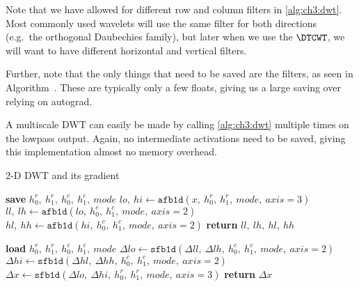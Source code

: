 Note that we have allowed for different row and column
filters in \autoref{alg:ch3:dwt}. Most commonly used wavelets will use the same
filter for both directions (e.g.\ the orthogonal Daubechies family), but later
when we use the $\DTCWT$, we will want to have different horizontal and vertical
filters.

Further, note that the only things that
need to be saved are the filters, as seen in
Algorithm~. These are typically only a
few floats, giving us a large saving over relying on autograd.

A multiscale DWT can easily be made by calling \autoref{alg:ch3:dwt}
multiple times on the lowpass output. Again, no intermediate activations need to be
saved, giving this implementation almost no memory overhead.

\begin{algorithm}[tb]
\caption{2-D DWT and its gradient}\label{alg:ch3:dwt}
\begin{algorithmic}[1]
  \State \textbf{save} $h_0^r,\ h_1^r,\ h_0^c,\ h_1^c,\ mode$  \label{line:ch3:dwt_save}
  \State $lo,\ hi \gets \mathtt{afb1d}(x,\ h_0^r,\ h_1^r,\ mode,\ axis=3)$ 
  \State $ll,\ lh \gets \mathtt{afb1d}(lo,\ h_0^c,\ h_1^c,\ mode,\ axis=2)$ 
  \State $hl,\ hh \gets \mathtt{afb1d}(hi,\ h_0^c,\ h_1^c,\ mode,\ axis=2)$ 
  \State \textbf{return} $ll,\ lh,\ hl,\ hh$
\EndFunction
\end{algorithmic}\vspace{10pt}
\begin{algorithmic}[1]
  \State \textbf{load} $h_0^r,\ h_1^r,\ h_0^c,\ h_1^c,\ mode$
  \State $\Delta lo \gets \mathtt{sfb1d}(\Delta ll,\ \Delta lh,\ h_0^c,\ h_1^c,\ mode,\ axis=2) $
  \State $\Delta hi \gets \mathtt{sfb1d}(\Delta hl,\ \Delta hh,\ h_0^c,\ h_1^c,\ mode,\ axis=2) $
  \State $\Delta x \gets \mathtt{sfb1d}(\Delta lo,\ \Delta hi,\ h_0^r,\ h_1^r,\ mode,\ axis=3) $
  \State \textbf{return} $\Delta x$
\EndFunction
\end{algorithmic}
\end{algorithm}


